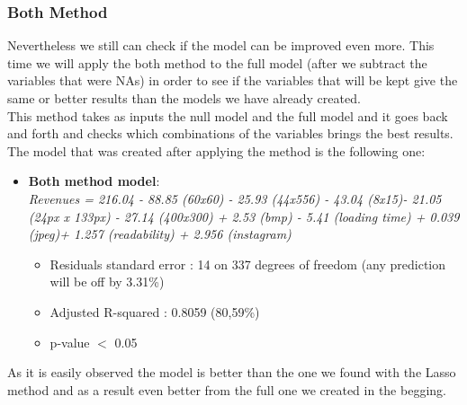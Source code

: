 \documentclass{book}
\begin{document}
\subsubsection{Both Method}
Nevertheless we still can check if the model can be improved even more. This time we will apply the both method to the full model (after we subtract the variables that were NAs) in order to see if the variables that will be kept give the same or better results than the models we have already created.\\
This method takes as inputs the null model and the full model and it goes back and forth and checks which combinations of the variables brings the best results. The model that was created after applying the method is the following one:\\
\begin{itemize}
\item \textbf{Both method model}:\\
\textit{Revenues = 216.04 - 88.85 (60x60) - 25.93 (44x556) - 43.04 (8x15)- 21.05 (24px x 133px) - 27.14 (400x300) + 2.53 (bmp) - 5.41 (loading time) + 0.039 (jpeg)+ 1.257 (readability) + 2.956 (instagram) }
\begin{itemize}
\item Residuals standard error : 14 on 337 degrees of freedom (any prediction will be off by 3.31\%)
\item Adjusted R-squared : 0.8059 (80,59\%)
\item p-value $<$ 0.05
\end{itemize}
\end{itemize}
As it is easily observed the model is better than the one we found with the Lasso method and as a result even better from the full one we created in the begging.
\end{document}
